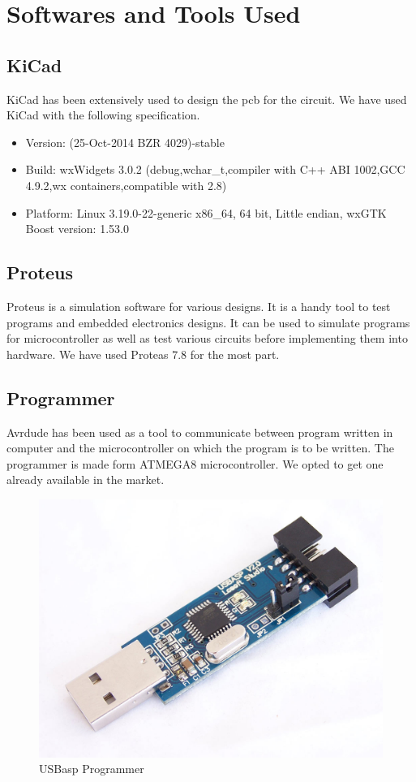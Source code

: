 \section{Softwares and Tools Used}

\subsection{KiCad}
KiCad has been extensively used to design the \gls{pcb} for the circuit. We have used KiCad with the following specification.
\begin{itemize}
\item[~]Version: (25-Oct-2014 BZR 4029)-stable
\item[~]Build: wxWidgets 3.0.2 (debug,wchar\_t,compiler with C++ ABI 1002,GCC 4.9.2,wx containers,compatible with 2.8)
\item[~]Platform: Linux 3.19.0-22-generic x86\_64, 64 bit, Little endian, wxGTK
Boost version: 1.53.0
\end{itemize}

\subsection{Proteus}
Proteus is a simulation software for various designs. It is a handy tool to test programs and embedded electronics designs. It can be used to simulate programs for microcontroller as well as  test various circuits before implementing them into hardware. We have used Proteas 7.8 for the most part.

\subsection{Programmer}
Avrdude has been used as a tool to communicate between program written in computer and the microcontroller on which the program is to be written. The programmer is made form ATMEGA8 microcontroller. We opted to get one already available in the market.
\begin{figure}[h]
	\centering
	\includegraphics[scale=0.18]{Images/Programmer.jpg}
	\caption{USBasp Programmer}
	\label{fig:Programmer}
\end{figure}


